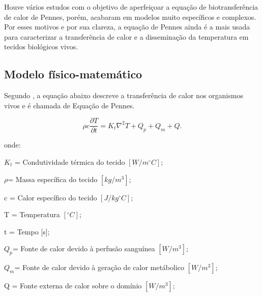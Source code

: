       Houve vários estudos com o objetivo de aperfeiçoar a equação de biotransferência de calor de Pennes, porém, acabaram em modelos muito específicos e complexos. Por esses motivos e por sua clareza, a equação de Pennes ainda é a mais usada para caracterizar a transferência de calor e a disseminação da temperatura em tecidos biológicos vivos.




 \subsection{Modelo físico-matemático}

    Segundo \cite{Carla}, a equação abaixo descreve a transferência de calor nos organismos vivos e é chamada de Equação de Pennes. 
   

  \begin{equation}\rho c\frac{\partial T}{\partial t} = K_{t}\nabla^{2}T+ Q_{p} + Q_{m} + Q . \end{equation}


  onde:


 $ K_{t} $ = Condutividade térmica do tecido $[W/m^{\circ}C];$ 

  $\rho $= Massa específica do tecido $[kg/m^3];$

 c = Calor específico do tecido $[J/kg^{\circ}C];$

  T = Temperatura $[^{\circ}C];$

  t = Tempo [s];

   $ Q_{p} $= Fonte de calor devido à perfusão sanguínea $[W/m^3];$


   $Q_{m} $= Fonte de calor devido à geração de calor metábolico $[W/m^3];$

  Q = Fonte externa de calor sobre o domínio $[W/m^3];$

